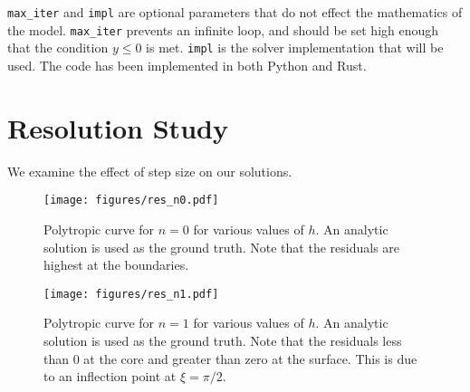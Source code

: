 \documentclass[twocolumn]{aastex631}
\begin{document}
\texttt{max\_iter} and \texttt{impl} are optional parameters that do not
effect the mathematics of the model. \texttt{max\_iter} prevents
an infinite loop, and should be set high enough that the
condition $y\le 0$ is met. \texttt{impl} is the solver
implementation that will be used. The code has been implemented
in both Python and Rust.


\section{Resolution Study}
\label{sec:res}

We examine the effect of step size on our solutions.

\begin{figure}
    \begin{centering}
        \texttt{[image: figures/res\_n0.pdf]}
        \caption{Polytropic curve for $n=0$ for various
        values of $h$. An analytic solution is used as
        the ground truth. Note that the residuals are highest
        at the boundaries.}
        \label{fig:res_n0}
    \end{centering}
\end{figure}

\begin{figure}
    \begin{centering}
        \texttt{[image: figures/res\_n1.pdf]}
        \caption{Polytropic curve for $n=1$ for various
        values of $h$. An analytic solution is used as
        the ground truth. Note that the residuals less than 0
        at the core and greater than zero at the surface. This
        is due to an inflection point at $\xi=\pi/2$.}
        \label{fig:res_n1}
    \end{centering}
\end{figure}






\end{document}
